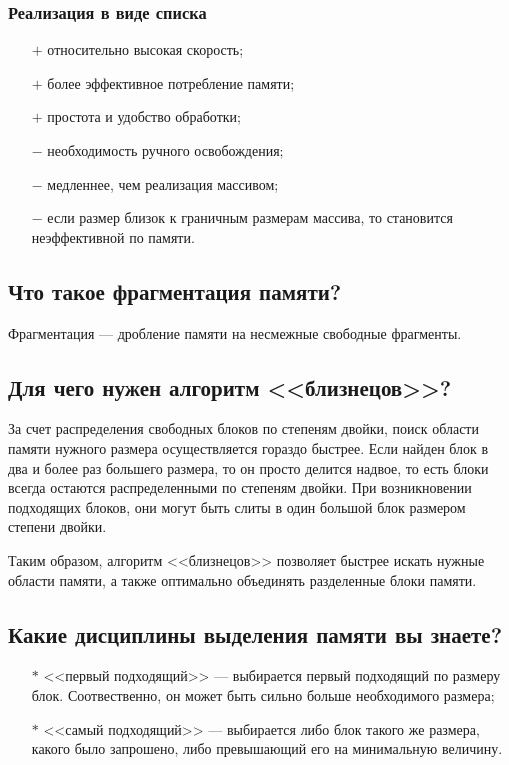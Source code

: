 \documentclass[a4paper,12pt]{extarticle}
\begin{document}
\subsubsection{Реализация в виде списка}
\begin{itemize}
	\item[$+$] относительно высокая скорость;
	\item[$+$] более эффективное потребление памяти;
	\item[$+$] простота и удобство обработки;
	\item[$-$] необходимость ручного освобождения;
	\item[$-$] медленнее, чем реализация массивом;
	\item[$-$] если размер близок к граничным размерам массива, то становится неэффективной по памяти.
\end{itemize}


\subsection{Что такое фрагментация памяти?}

Фрагментация --- дробление памяти на несмежные свободные фрагменты.

\subsection{Для чего нужен алгоритм <<близнецов>>?}

За счет распределения свободных блоков по степеням двойки, поиск области памяти нужного размера осуществляется гораздо быстрее. Если найден блок в два и более раз большего размера, то он просто делится надвое, то есть блоки всегда остаются распределенными по степеням двойки. При возникновении подходящих блоков, они могут быть слиты в один большой блок размером степени двойки.

Таким образом, алгоритм <<близнецов>> позволяет быстрее искать нужные области памяти, а также оптимально объединять разделенные блоки памяти.

\subsection{Какие дисциплины выделения памяти вы знаете?}

\begin{itemize}
	\item[$*$] <<первый подходящий>> --- выбирается первый подходящий по размеру блок. Соотвественно, он может быть сильно больше необходимого размера;
	\item[$*$] <<самый подходящий>> --- выбирается либо блок такого же размера, какого было запрошено, либо превышающий его на минимальную величину.
\end{itemize}
\end{document}
